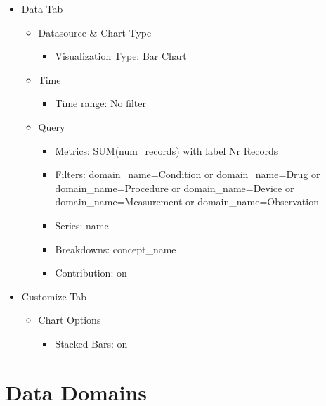 \documentclass[
]{book}
\providecommand{\tightlist}{%
  \setlength{\itemsep}{0pt}\setlength{\parskip}{0pt}}
\begin{document}
\begin{itemize}
\tightlist
\item
  Data Tab

  \begin{itemize}
  \tightlist
  \item
    Datasource \& Chart Type

    \begin{itemize}
    \tightlist
    \item
      Visualization Type: Bar Chart
    \end{itemize}
  \item
    Time

    \begin{itemize}
    \tightlist
    \item
      Time range: No filter
    \end{itemize}
  \item
    Query

    \begin{itemize}
    \tightlist
    \item
      Metrics: SUM(num\_records) with label Nr Records
    \item
      Filters: domain\_name=Condition or domain\_name=Drug or domain\_name=Procedure or domain\_name=Device or domain\_name=Measurement or domain\_name=Observation
    \item
      Series: name
    \item
      Breakdowns: concept\_name
    \item
      Contribution: on
    \end{itemize}
  \end{itemize}
\item
  Customize Tab

  \begin{itemize}
  \tightlist
  \item
    Chart Options

    \begin{itemize}
    \tightlist
    \item
      Stacked Bars: on
    \end{itemize}
  \end{itemize}
\end{itemize}

\hypertarget{data-domains}{%
\chapter{Data Domains}\label{data-domains}}
\end{document}
